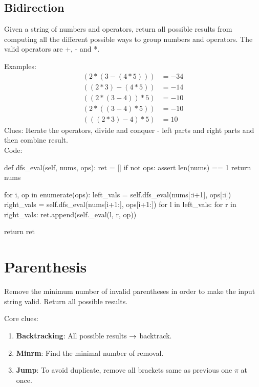 \subsection{Bidirection}
 Given a string of numbers and operators, return all possible
results from computing all the different possible ways to group numbers and operators.
The valid operators are +, - and *.

Examples:
\begin{align*}
(2*(3-(4*5))) &= -34 \\
((2*3)-(4*5)) &= -14 \\
((2*(3-4))*5) &= -10 \\
(2*((3-4)*5)) &= -10 \\
(((2*3)-4)*5) &= 10
\end{align*}
Clues: Iterate the operators, divide and conquer - left parts and right parts and then
combine result. \\
Code:
\begin{python}
def dfs_eval(self, nums, ops):
  ret = []
  if not ops:
    assert len(nums) == 1
    return nums

  for i, op in enumerate(ops):
    left_vals = self.dfs_eval(nums[:i+1], ops[:i])
    right_vals = self.dfs_eval(nums[i+1:], ops[i+1:])
    for l in left_vals:
      for r in right_vals:
        ret.append(self._eval(l, r, op))

  return ret
\end{python}
\section{Parenthesis}
 Remove the minimum number of invalid parentheses in order to make the input string valid. Return all possible results.

Core clues:
\begin{enumerate}
\item \textbf{Backtracking}: All possible results $\rightarrow$ backtrack. 
\item \textbf{Minrm}: Find the minimal number of removal.
\item \textbf{Jump}: To avoid duplicate, remove all brackets same as previous one $\pi$ at once.
\end{enumerate}

